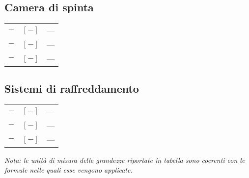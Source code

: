 \begin{multicols}{2}
	\subsection{Camera di spinta}
	\begin{tabularx}{\linewidth}{ccX}
		$\bm{-}$ & $[-]$ & --- \\
		$\bm{-}$ & $[-]$ & --- \\
		$\bm{-}$ & $[-]$ & ---
	\end{tabularx}

	\subsection{Sistemi di raffreddamento}
	\begin{tabularx}{\linewidth}{ccX}
		$\bm{-}$ & $[-]$ & --- \\
		$\bm{-}$ & $[-]$ & --- \\
		$\bm{-}$ & $[-]$ & ---
	\end{tabularx}

\end{multicols}

\textit{Nota: le unità di misura delle grandezze riportate in tabella sono coerenti con le formule nelle quali esse vengono applicate.}